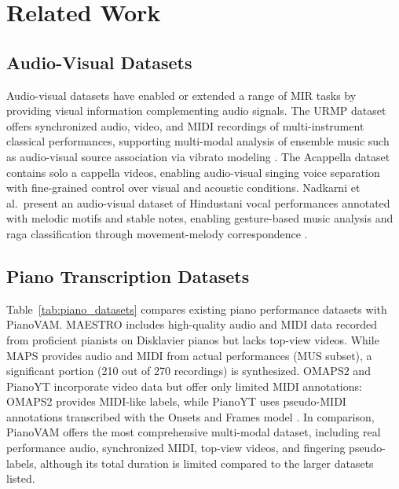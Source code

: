 \documentclass{article}
\begin{document}
\section{Related Work}
\subsection{Audio-Visual Datasets}
Audio-visual datasets have enabled or extended a range of MIR tasks by providing visual information complementing audio signals. The URMP dataset \cite{TMM18Li} offers synchronized audio, video, and MIDI recordings of multi-instrument classical performances, supporting multi-modal analysis of ensemble music such as audio-visual source association via vibrato modeling \cite{SMC17Li}. The Acappella dataset \cite{BMVC21Montesinos} contains solo a cappella videos, enabling audio-visual singing voice separation with fine-grained control over visual and acoustic conditions. Nadkarni et al.\ present an audio-visual dataset of Hindustani vocal performances annotated with melodic motifs and stable notes, enabling gesture-based music analysis and raga classification through movement-melody correspondence \cite{TISMIR24Nadkarni}.




\subsection{Piano Transcription Datasets}
Table~\ref{tab:piano_datasets} compares existing piano performance datasets with PianoVAM. MAESTRO \cite{ICLR19Hawthorne} includes high-quality audio and MIDI data recorded from proficient pianists on Disklavier pianos but lacks top-view videos. While MAPS \cite{Emiya2010} provides audio and MIDI from actual performances (MUS subset), a significant portion (210 out of 270 recordings) is synthesized. OMAPS2 \cite{ICASSPW23Li} and PianoYT \cite{ICASSP20Koepke} incorporate video data but offer only limited MIDI annotations: OMAPS2 provides MIDI-like labels, while PianoYT uses pseudo-MIDI annotations transcribed with the Onsets and Frames model \cite{ISMIR18Hawthorne}. In comparison, PianoVAM offers the most comprehensive multi-modal dataset, including real performance audio, synchronized MIDI, top-view videos, and fingering pseudo-labels, although its total duration is limited compared to the larger datasets listed.
\end{document}
